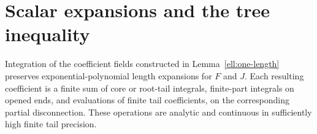 \section{Scalar expansions and the tree inequality}
\label{ell:scalar-calculus}

\begin{lemma}
\label{ell:finite-parts}
Integration of the coefficient fields constructed in
Lemma~\ref{ell:one-length} preserves exponential-polynomial
length expansions for $F$ and $J$.  Each resulting coefficient
is a finite sum of core or root-tail integrals, finite-part
integrals on opened ends, and evaluations of finite tail
coefficients, on the corresponding partial disconnection.
These operations are analytic and continuous in sufficiently
high finite tail precision.
\end{lemma}


